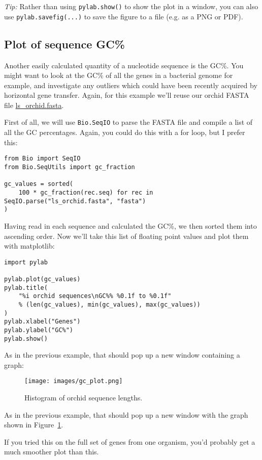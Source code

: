 \emph{Tip:} Rather than using \verb|pylab.show()| to show the plot in a window,
you can also use \verb|pylab.savefig(...)| to save the figure to a file
(e.g. as a PNG or PDF).

\subsection{Plot of sequence GC\%}

Another easily calculated quantity of a nucleotide sequence is the GC\%.  You might
want to look at the GC\% of all the genes in a bacterial genome for example, and
investigate any outliers which could have been recently acquired by horizontal gene
transfer.  Again, for this example we'll reuse our orchid FASTA file
\href{https://raw.githubusercontent.com/biopython/biopython/master/Doc/examples/ls_orchid.fasta}{ls\_orchid.fasta}.

First of all, we will use \verb|Bio.SeqIO| to parse the FASTA file and compile a list
of all the GC percentages.  Again, you could do this with a for loop, but I prefer this:

\begin{verbatim}
from Bio import SeqIO
from Bio.SeqUtils import gc_fraction

gc_values = sorted(
    100 * gc_fraction(rec.seq) for rec in SeqIO.parse("ls_orchid.fasta", "fasta")
)
\end{verbatim}

Having read in each sequence and calculated the GC\%, we then sorted them into ascending
order. Now we'll take this list of floating point values and plot them with matplotlib:

\begin{verbatim}
import pylab

pylab.plot(gc_values)
pylab.title(
    "%i orchid sequences\nGC%% %0.1f to %0.1f"
    % (len(gc_values), min(gc_values), max(gc_values))
)
pylab.xlabel("Genes")
pylab.ylabel("GC%")
pylab.show()
\end{verbatim}

%
%
\begin{htmlonly}
\noindent As in the previous example, that should pop up a new window containing a graph:


\end{htmlonly}
%
%
\begin{latexonly}
\begin{figure}[htbp]
\centering
\texttt{[image: images/gc\_plot.png]}
\caption{Histogram of orchid sequence lengths.}
\label{fig:seq-gc-plot}
\end{figure}
\noindent As in the previous example, that should pop up a new window with the graph shown in Figure~\ref{fig:seq-gc-plot}.
\end{latexonly}
%
%
If you tried this on the full set of genes from one organism, you'd probably get a much
smoother plot than this.

